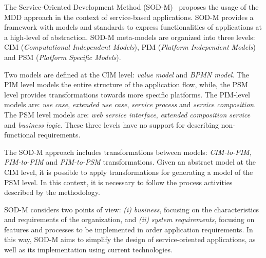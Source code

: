 
The Service-Oriented Development Method (SOD-M)~\cite{decastro1}
proposes the usage of the MDD approach in the context of service-based applications.
SOD-M provides a framework with models and standards to express functionalities
of applications at a high-level of abstraction. SOD-M meta-models are organized 
into three levels: CIM (\textit{Computational Independent Models}), 
PIM (\textit{Platform Independent Models}) and PSM (\textit{Platform Specific Models}).

Two models are defined at the CIM level: \textit{value model} 
and \textit{BPMN model}. 
The PIM level models the entire structure of the application flow,
while, the PSM level provides transformations towards more specific platforms.
The PIM-level models are: \textit{use case}, \textit{extended use case}, \textit{service process} and
\textit{service composition}. The PSM level models are: \textit{web service interface}, \textit{extended composition service} and \textit{business logic}. 
These three levels have no support for describing non-functional requirements. 

The SOD-M approach includes transformations between models:
\textit{CIM-to-PIM, PIM-to-PIM} and \textit{PIM-to-PSM} transformations. Given
an abstract model at the CIM level, it is possible to apply transformations for
generating a model of the PSM level. In this context, it is necessary to
follow the process activities described by the methodology. 

SOD-M considers two points of view:
\textit{(i)} \textit{business}, focusing on the characteristics and requirements
of the organization, and \textit{(ii)} \textit{system requirements}, focusing on
features and processes to be implemented in order application requirements. In
this way, SOD-M aims to simplify the design of service-oriented applications, as
well as its implementation using current technologies.

